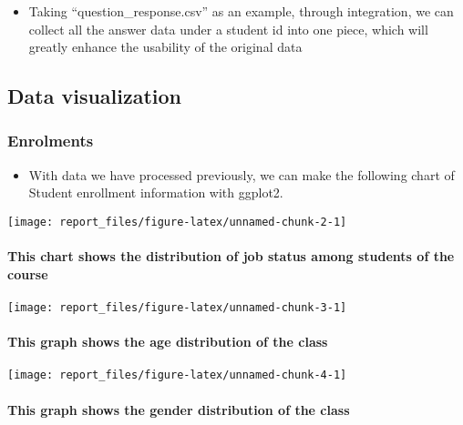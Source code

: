 \documentclass[]{article}
\providecommand{\tightlist}{%
  \setlength{\itemsep}{0pt}\setlength{\parskip}{0pt}}
\let\oldparagraph\paragraph
\renewcommand{\paragraph}[1]{\oldparagraph{#1}\mbox{}}
\begin{document}
\begin{itemize}
\tightlist
\item
  Taking ``question\_response.csv'' as an example, through integration,
  we can collect all the answer data under a student id into one piece,
  which will greatly enhance the usability of the original data
\end{itemize}

\hypertarget{data-visualization}{%
\subsection{Data visualization}\label{data-visualization}}

\hypertarget{enrolments}{%
\subsubsection{Enrolments}\label{enrolments}}

\begin{itemize}
\tightlist
\item
  With data we have processed previously, we can make the following
  chart of Student enrollment information with ggplot2.
\end{itemize}

\texttt{[image: report\_files/figure-latex/unnamed-chunk-2-1]}

\hypertarget{this-chart-shows-the-distribution-of-job-status-among-students-of-the-course}{%
\paragraph{This chart shows the distribution of job status among
students of the
course}\label{this-chart-shows-the-distribution-of-job-status-among-students-of-the-course}}

\texttt{[image: report\_files/figure-latex/unnamed-chunk-3-1]}

\hypertarget{this-graph-shows-the-age-distribution-of-the-class}{%
\paragraph{This graph shows the age distribution of the
class}\label{this-graph-shows-the-age-distribution-of-the-class}}

\texttt{[image: report\_files/figure-latex/unnamed-chunk-4-1]}

\hypertarget{this-graph-shows-the-gender-distribution-of-the-class}{%
\paragraph{This graph shows the gender distribution of the
class}\label{this-graph-shows-the-gender-distribution-of-the-class}}
\end{document}
